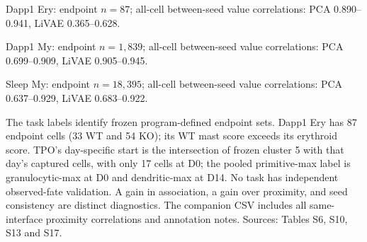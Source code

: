 \noindent Dapp1 Ery: endpoint $n=87$; all-cell between-seed value correlations: PCA 0.890--0.941, LiVAE 0.365--0.628.\par
\noindent Dapp1 My: endpoint $n=1,839$; all-cell between-seed value correlations: PCA 0.699--0.909, LiVAE 0.905--0.945.\par
\noindent Sleep My: endpoint $n=18,395$; all-cell between-seed value correlations: PCA 0.637--0.929, LiVAE 0.683--0.922.\par
\par\smallskip
The task labels identify frozen program-defined endpoint sets. Dapp1 Ery has 87 endpoint cells (33 WT and 54 KO); its WT mast score exceeds its erythroid score. TPO's day-specific start is the intersection of frozen cluster 5 with that day's captured cells, with only 17 cells at D0; the pooled primitive-max label is granulocytic-max at D0 and dendritic-max at D14. No task has independent observed-fate validation. A gain in association, a gain over proximity, and seed consistency are distinct diagnostics. The companion CSV includes all same-interface proximity correlations and annotation notes. Sources: Tables S6, S10, S13 and S17.
\endgroup
